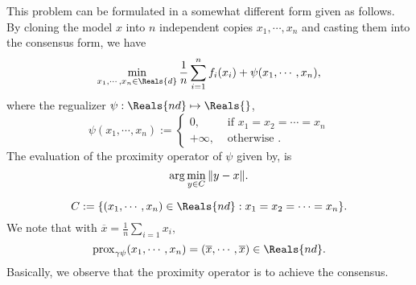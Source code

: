 \begin{itemize}
This problem can be formulated in a somewhat different form given as follows. By cloning the model $x$ into $n$ independent copies $x_1,\cdots,x_n$ and casting them into the consensus form, we have  
\begin{equation}
\min_{x_1,\cdots,x_n \in \Reals{d}} \frac{1}{n} \sum_{i=1}^n f_i(x_i) + \psi (x_1,\cdots,x_n), 
\end{equation}
where the regualizer $\psi : \Reals{nd} \mapsto \Reals{}$, 
\begin{equation}
\psi(x_1,\cdots,x_n) :=  \left \{ \begin{array}{cc} 
0, & \mbox{ if } x_1 = x_2 = \cdots = x_n \\
+\infty, & \mbox{ otherwise }. 
\end{array} \right . 
\end{equation}
The evaluation of the proximity operator of $\psi$ given by, is 
\begin{equation}
{\rm arg}\min_{y \in C} \|y - x\|. 
\end{equation}

\begin{equation}
C := \{(x_1,\cdots,x_n) \in \Reals{nd} : x_1 = x_2 = \cdots = x_n\}.     
\end{equation}
We note that with $\overline{x} = \frac{1}{n} \sum_{i=1} x_i,$
\begin{equation}
{\rm prox}_{\gamma \psi}(x_1, \cdots, x_n) = (\overline{x},\cdots,\overline{x}) \in \Reals{nd}. 
\end{equation}
Basically, we observe that the proximity operator is to achieve the consensus. 

%

\end{itemize}
